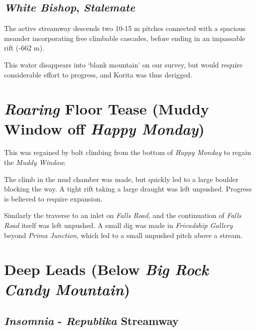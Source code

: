\hypertarget{white-bishop-stalemate}{%
\subsection{\texorpdfstring{\emph{White Bishop},
\emph{Stalemate}}{White Bishop, Stalemate}}\label{white-bishop-stalemate}}

The active streamway descends two 10-15 m pitches connected with a
spacious meander incorporating free climbable cascades, before ending in
an impassable rift (-662 m).

This water disappears into `blank mountain' on our survey, but would
require considerable effort to progress, and Korita was thus derigged.

\hypertarget{roaring-floor-tease-muddy-window-off-happy-monday}{%
\section{\texorpdfstring{\emph{Roaring} Floor Tease (\textbf{Muddy
Window} off \emph{Happy
Monday})}{Roaring Floor Tease (Muddy Window off Happy Monday)}}\label{roaring-floor-tease-muddy-window-off-happy-monday}}

This was regained by bolt climbing from the bottom of \emph{Happy
Monday} to regain the \emph{Muddy Window}.

The climb in the mud chamber was made, but quickly led to a large
boulder blocking the way. A tight rift taking a large draught was left
unpushed. Progress is believed to require expansion.

Similarly the traverse to an inlet on \emph{Falls Road}, and the
continuation of \emph{Falls Road} itself was left unpushed. A small dig
was made in \emph{Friendship Gallery} beyond \emph{Prima Junction},
which led to a small unpushed pitch above a stream.

\hypertarget{deep-leads-below-big-rock-candy-mountain}{%
\section{\texorpdfstring{Deep Leads (Below \emph{Big Rock Candy
Mountain})}{Deep Leads (Below Big Rock Candy Mountain)}}\label{deep-leads-below-big-rock-candy-mountain}}

\hypertarget{insomnia---republika-streamway}{%
\subsection{\texorpdfstring{\emph{Insomnia} - \emph{Republika}
Streamway}{Insomnia - Republika Streamway}}\label{insomnia---republika-streamway}}

